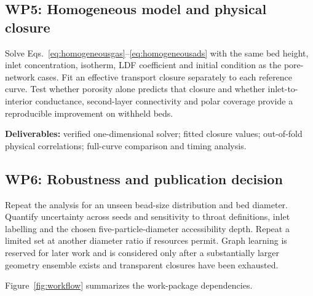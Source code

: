 \documentclass[12pt,a4paper]{article}
\begin{document}
\subsection*{WP5: Homogeneous model and physical closure}

Solve Eqs.~\eqref{eq:homogeneousgas}--\eqref{eq:homogeneousads} with the same bed
height, inlet concentration, isotherm, LDF coefficient and initial condition as
the pore-network cases. Fit an effective transport closure separately to each
reference curve. Test whether porosity alone predicts that closure and whether
inlet-to-interior conductance, second-layer connectivity and polar coverage
provide a reproducible improvement on withheld beds.

\textbf{Deliverables:} verified one-dimensional solver; fitted closure values;
out-of-fold physical correlations; full-curve comparison and timing analysis.

\subsection*{WP6: Robustness and publication decision}

Repeat the analysis for an unseen bead-size distribution and bed diameter.
Quantify uncertainty across seeds and sensitivity to throat definitions, inlet
labelling and the chosen five-particle-diameter accessibility depth. Repeat a
limited set at another diameter ratio if resources permit. Graph learning is
reserved for later work and is considered only after a substantially larger
geometry ensemble exists and transparent closures have been exhausted.

Figure~\ref{fig:workflow} summarizes the work-package dependencies.
\end{document}
